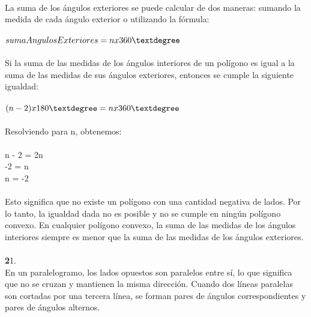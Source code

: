 \documentclass{article}
\begin{document}
\\
La suma de los ángulos exteriores se puede calcular de dos maneras: sumando la medida de cada ángulo exterior o utilizando la fórmula:\\
\\
$sumaAngulosExteriores = n x 360\textdegree$\\
\\
Si la suma de las medidas de los ángulos interiores de un polígono es igual a la suma de las medidas de sus ángulos exteriores, entonces se cumple la siguiente igualdad:\\
\\
$(n - 2) x 180\textdegree = n x 360\textdegree$\\
\\
Resolviendo para n, obtenemos:\\
\\
n - 2 = 2n\\
-2 = n\\
n = -2\\
\\
Esto significa que no existe un polígono con una cantidad negativa de lados. Por lo tanto, la igualdad dada no es posible y no se cumple en ningún polígono convexo. En cualquier polígono convexo, la suma de las medidas de los ángulos interiores siempre es menor que la suma de las medidas de los ángulos exteriores.\\
\\
{\textbf 21. }\\
En un paralelogramo, los lados opuestos son paralelos entre sí, lo que significa que no se cruzan y mantienen la misma dirección. Cuando dos líneas paralelas son cortadas por una tercera línea, se forman pares de ángulos correspondientes y pares de ángulos alternos.
\end{document}
